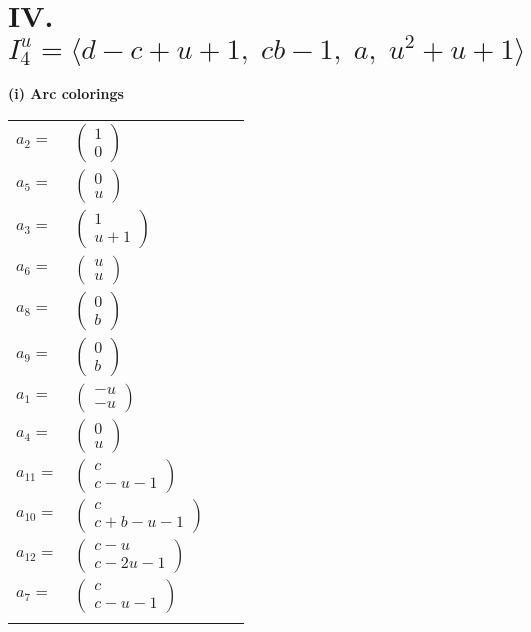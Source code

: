 \documentclass[1p]{elsarticle_modified}
\theoremstyle{definition}
\begin{document}
\centering \section*{IV. $I^u_{4}= \langle d- c+u+1,\;c b-1,\;a,\;u^2+u+1 \rangle$}
\flushleft \textbf{(i) Arc colorings}\\
\begin{tabular}{m{7pt} m{180pt} m{7pt} m{180pt} }
\flushright $a_{2}=$&$\begin{pmatrix}1\\0\end{pmatrix}$ \\
\flushright $a_{5}=$&$\begin{pmatrix}0\\u\end{pmatrix}$ \\
\flushright $a_{3}=$&$\begin{pmatrix}1\\u+1\end{pmatrix}$ \\
\flushright $a_{6}=$&$\begin{pmatrix}u\\u\end{pmatrix}$ \\
\flushright $a_{8}=$&$\begin{pmatrix}0\\b\end{pmatrix}$ \\
\flushright $a_{9}=$&$\begin{pmatrix}0\\b\end{pmatrix}$ \\
\flushright $a_{1}=$&$\begin{pmatrix}- u\\- u\end{pmatrix}$ \\
\flushright $a_{4}=$&$\begin{pmatrix}0\\u\end{pmatrix}$ \\
\flushright $a_{11}=$&$\begin{pmatrix}c\\c- u-1\end{pmatrix}$ \\
\flushright $a_{10}=$&$\begin{pmatrix}c\\c+b- u-1\end{pmatrix}$ \\
\flushright $a_{12}=$&$\begin{pmatrix}c- u\\c-2 u-1\end{pmatrix}$ \\
\flushright $a_{7}=$&$\begin{pmatrix}c\\c- u-1\end{pmatrix}$\\&\end{tabular}
\end{document}

